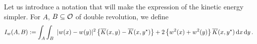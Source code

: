 Let us introduce a notation that will make the expression of the kinetic energy simpler. For $A$,
$B\subseteq \mathcal{O}$ of double revolution, we define
$$
I_w(A,B) := \int_A  \int_B  \ |w(x)-w(y)|^2 \left\{ \overline{K}(x,y) - \overline{K}(x,y^\star) \right\}  +2 \left\{w^2(x)+w^2(y)\right\} \overline{K}(x,y^\star) \,\mathrm{d} x \,\mathrm{d} y\,.
$$
%
%
%
%
%
